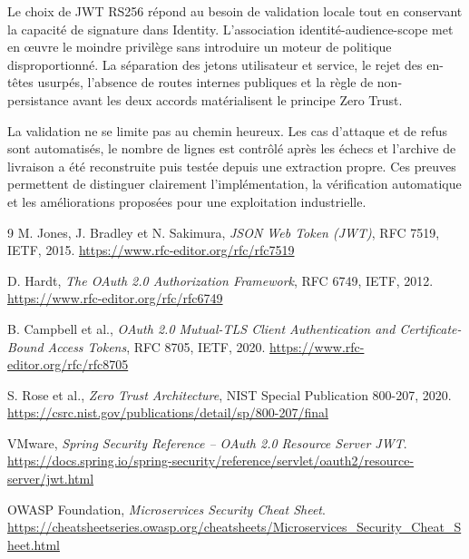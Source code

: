 \documentclass[12pt,a4paper,oneside]{report}
\begin{document}
Le choix de JWT RS256 répond au besoin de validation locale tout en conservant
la capacité de signature dans Identity. L'association identité-audience-scope
met en œuvre le moindre privilège sans introduire un moteur de politique
disproportionné. La séparation des jetons utilisateur et service, le rejet des
en-têtes usurpés, l'absence de routes internes publiques et la règle de non-
persistance avant les deux accords matérialisent le principe Zero Trust.

La validation ne se limite pas au chemin heureux. Les cas d'attaque et de refus
sont automatisés, le nombre de lignes est contrôlé après les échecs et l'archive
de livraison a été reconstruite puis testée depuis une extraction propre. Ces
preuves permettent de distinguer clairement l'implémentation, la vérification
automatique et les améliorations proposées pour une exploitation industrielle.

\begin{thebibliography}{9}
M. Jones, J. Bradley et N. Sakimura,
\emph{JSON Web Token (JWT)}, RFC 7519, IETF, 2015.
\url{https://www.rfc-editor.org/rfc/rfc7519}

D. Hardt,
\emph{The OAuth 2.0 Authorization Framework}, RFC 6749, IETF, 2012.
\url{https://www.rfc-editor.org/rfc/rfc6749}

B. Campbell et al.,
\emph{OAuth 2.0 Mutual-TLS Client Authentication and Certificate-Bound Access Tokens},
RFC 8705, IETF, 2020.
\url{https://www.rfc-editor.org/rfc/rfc8705}

S. Rose et al.,
\emph{Zero Trust Architecture}, NIST Special Publication 800-207, 2020.
\url{https://csrc.nist.gov/publications/detail/sp/800-207/final}

VMware,
\emph{Spring Security Reference -- OAuth 2.0 Resource Server JWT}.
\url{https://docs.spring.io/spring-security/reference/servlet/oauth2/resource-server/jwt.html}

OWASP Foundation,
\emph{Microservices Security Cheat Sheet}.
\url{https://cheatsheetseries.owasp.org/cheatsheets/Microservices_Security_Cheat_Sheet.html}
\end{thebibliography}

\appendix
\end{document}
